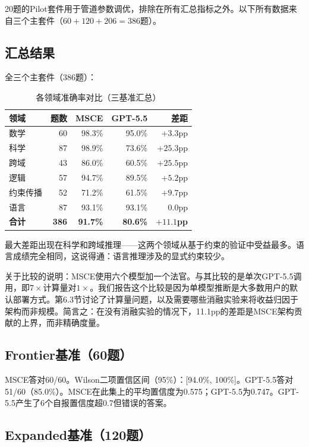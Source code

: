 \documentclass[11pt,a4paper]{ctexart}
\begin{document}
20题的Pilot套件用于管道参数调优，排除在所有汇总指标之外。以下所有数据来自三个主套件（$60 + 120 + 206 = 386$题）。

\subsection{汇总结果}

全三个主套件（386题）：

\begin{table}[ht]
\centering
\caption{各领域准确率对比（三基准汇总）}
\begin{tabular}{lrrrr}
\toprule
\textbf{领域} & \textbf{题数} & \textbf{MSCE} & \textbf{GPT-5.5} & \textbf{差距} \\
\midrule
数学 & 60 & 98.3\% & 95.0\% & $+3.3$pp \\
科学 & 87 & 98.9\% & 73.6\% & $+25.3$pp \\
跨域 & 43 & 86.0\% & 60.5\% & $+25.5$pp \\
逻辑 & 57 & 94.7\% & 89.5\% & $+5.2$pp \\
约束传播 & 52 & 71.2\% & 61.5\% & $+9.7$pp \\
语言 & 87 & 93.1\% & 93.1\% & $0.0$pp \\
\midrule
\textbf{合计} & \textbf{386} & \textbf{91.7\%} & \textbf{80.6\%} & \textbf{$+11.1$pp} \\
\bottomrule
\end{tabular}
\end{table}

最大差距出现在科学和跨域推理——这两个领域从基于约束的验证中受益最多。语言成绩完全相同，这说得通：语言推理涉及的显式约束较少。

关于比较的说明：MSCE使用六个模型加一个法官。与其比较的是单次GPT-5.5调用，即$7\times$计算量对$1\times$。我们报告这个比较是因为单模型推断是大多数用户的默认部署方式。第6.3节讨论了计算量问题，以及需要哪些消融实验来将收益归因于架构而非规模。简言之：在没有消融实验的情况下，11.1pp的差距是MSCE架构贡献的上界，而非精确度量。

\subsection{Frontier基准（60题）}

MSCE答对60/60。Wilson二项置信区间（95\%）：[94.0\%, 100\%]。GPT-5.5答对51/60（85.0\%）。MSCE在此集上的平均置信度为0.575；GPT-5.5为0.747。GPT-5.5产生了6个自报置信度超0.7但错误的答案。

\subsection{Expanded基准（120题）}
\end{document}
